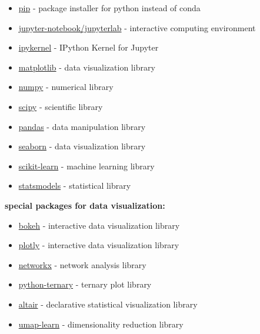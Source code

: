 \documentclass[
  letterpaper,
  DIV=11,
  numbers=noendperiod]{scrreprt}
\providecommand{\tightlist}{%
  \setlength{\itemsep}{0pt}\setlength{\parskip}{0pt}}\usepackage{longtable,booktabs,array}
\begin{document}
\begin{itemize}
\tightlist
\item
  \href{https://packaging.python.org/en/latest/guides/tool-recommendations/}{pip}
  - package installer for python instead of conda
\item
  \href{https://jupyter.org/}{jupyter-notebook/jupyterlab} - interactive
  computing environment
\item
  \href{https://pypi.org/project/ipykernel/}{ipykernel} - IPython Kernel
  for Jupyter
\item
  \href{https://matplotlib.org}{matplotlib} - data visualization library
\item
  \href{https://numpy.org}{numpy} - numerical library
\item
  \href{https://docs.scipy.org/doc/scipy/reference/}{scipy} - scientific
  library
\item
  \href{https://pandas.pydata.org/docs/}{pandas} - data manipulation
  library
\item
  \href{https://seaborn.pydata.org/examples/index.html}{seaborn} - data
  visualization library
\item
  \href{https://scikit-learn.org/stable/}{scikit-learn} - machine
  learning library
\item
  \href{https://www.statsmodels.org/stable/index.html}{statsmodels} -
  statistical library
\end{itemize}

\textbf{special packages for data visualization:}

\begin{itemize}
\tightlist
\item
  \href{https://docs.bokeh.org/en/latest/index.html}{bokeh} -
  interactive data visualization library
\item
  \href{https://plotly.com/python/}{plotly} - interactive data
  visualization library
\item
  \href{https://networkx.org/documentation/stable/}{networkx} - network
  analysis library
\item
  \href{https://python-ternary.readthedocs.io/en/latest/}{python-ternary}
  - ternary plot library
\item
  \href{https://altair-viz.github.io/}{altair} - declarative statistical
  visualization library
\item
  \href{https://umap-learn.readthedocs.io/en/latest/}{umap-learn} -
  dimensionality reduction library
\end{itemize}
\end{document}
